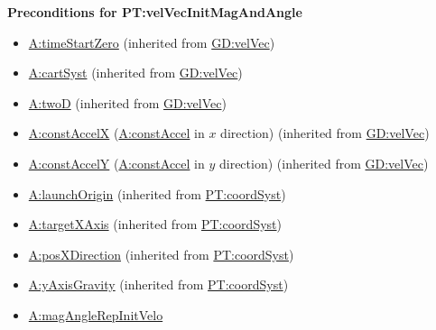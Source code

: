 \documentclass[12pt]{article}
\begin{document}
\noindent \textbf{Preconditions for PT:velVecInitMagAndAngle}
\begin{itemize}
\item \hyperref[timeStartZero]{A:timeStartZero} (inherited from \hyperref[GD:velVec]{GD:velVec})
\item \hyperref[cartSyst]{A:cartSyst} (inherited from \hyperref[GD:velVec]{GD:velVec})
\item \hyperref[twoD]{A:twoD} (inherited from \hyperref[GD:velVec]{GD:velVec})
\item \hyperref[constAccelX]{A:constAccelX} (\hyperref[constAccel]{A:constAccel}
in $x$ direction) (inherited from \hyperref[GD:velVec]{GD:velVec})
\item \hyperref[constAccelY]{A:constAccelY} (\hyperref[constAccel]{A:constAccel}
in $y$ direction) (inherited from \hyperref[GD:velVec]{GD:velVec})
\item \hyperref[launchOrigin]{A:launchOrigin} (inherited from \hyperref[PT:coordSyst]{PT:coordSyst})
\item \hyperref[targetXAxis]{A:targetXAxis} (inherited from \hyperref[PT:coordSyst]{PT:coordSyst})
\item \hyperref[posXDirection]{A:posXDirection} (inherited from \hyperref[PT:coordSyst]{PT:coordSyst})
\item \hyperref[yAxisGravity]{A:yAxisGravity} (inherited from \hyperref[PT:coordSyst]{PT:coordSyst})
\item \hyperref[magAngleRepInitVelo]{A:magAngleRepInitVelo}
\end{itemize}
\end{document}
